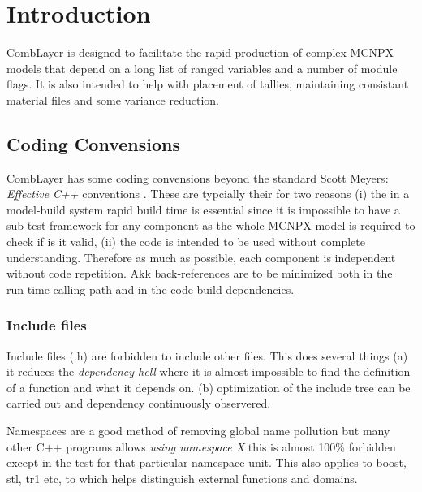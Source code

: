 \section{Introduction}

CombLayer is designed to facilitate the rapid production of complex
MCNPX models that depend on a long list of ranged variables and a
number of module flags. It is also intended to help with placement of tallies,
maintaining consistant material files and some variance reduction.

\subsection{Coding Convensions}

CombLayer has some coding convensions beyond the standard Scott Meyers:
{\it Effective C++} conventions \cite{Meyers}. These are typcially their for
two reasons (i) the in a model-build system rapid build time is
essential since it is impossible to have a sub-test framework for any
component as the whole MCNPX model is required to check if is it
valid, (ii) the code is intended to be used without complete
understanding. Therefore as much as possible, each component is
independent without code repetition. Akk back-references are to be minimized
both in the run-time calling path and in the code build dependencies.

\subsubsection{Include files}
\label{Sec:IntroInclude}
 Include files (.h) are forbidden to include other
files. This does several things (a) it reduces the {\it dependency
  hell} where it is almost impossible to find the definition of a
function and what it depends on. (b) optimization of the include tree
can be carried out and dependency continuously observered. 

Namespaces are a good method of removing global name pollution but
many other C++ programs allows {\it using namespace X} this is almost
100\% forbidden except in the test for that particular namespace
unit. This also applies to boost, stl, tr1 etc, to which helps
distinguish external functions and domains.


